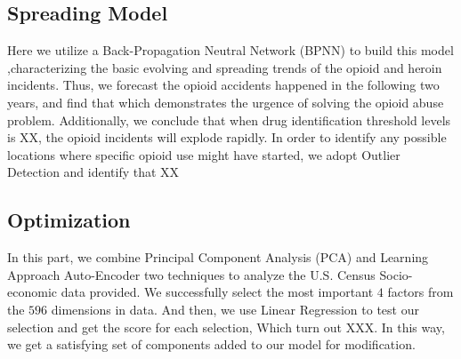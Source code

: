 \documentclass{mcmthesis}
\begin{document}
\subsection*{Spreading Model }
Here we utilize a Back-Propagation Neutral Network (BPNN) to build this model ,characterizing the basic evolving and spreading trends of the opioid and heroin incidents. Thus, we forecast the opioid accidents happened in the following two years, and find that 
which demonstrates the urgence of solving the opioid abuse problem.
Additionally, we conclude that when drug identification threshold levels is XX, the opioid incidents will explode rapidly.
In order to identify any possible locations where specific opioid use 
might have started, we adopt Outlier Detection and identify that XX

\subsection*{Optimization}
 In this part, we combine Principal Component Analysis (PCA) and Learning Approach Auto-Encoder two techniques to analyze the U.S. Census Socio-economic data provided. We successfully select the most important $4$ factors from the $596$ dimensions in data. And then, we use Linear Regression to test our selection and get the score for each selection, Which turn out XXX. In this way, we get a satisfying set of components added to our model for modification. 
\end{document}
